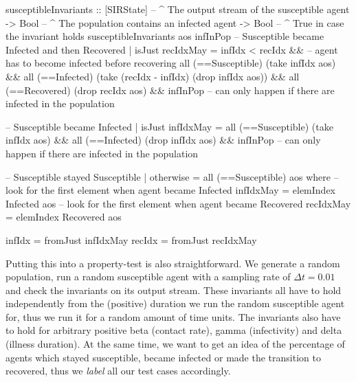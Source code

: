 \begin{HaskellCode}
susceptibleInvariants :: [SIRState] -- ^ The output stream of the susceptible agent 
                      -> Bool       -- ^ The population contains an infected agent
                      -> Bool       -- ^ True in case the invariant holds
susceptibleInvariants aos infInPop
    -- Susceptible became Infected and then Recovered
    | isJust recIdxMay 
      = infIdx < recIdx &&  -- agent has to become infected before recovering
        all (==Susceptible) (take infIdx aos) && 
        all (==Infected) (take (recIdx - infIdx) (drop infIdx aos)) && 
        all (==Recovered) (drop recIdx aos) &&
        infInPop  -- can only happen if there are infected in the population

    -- Susceptible became Infected
    | isJust infIdxMay 
      = all (==Susceptible) (take infIdx aos) &&
        all (==Infected) (drop infIdx aos) &&
        infInPop -- can only happen if there are infected in the population

    -- Susceptible stayed Susceptible
    | otherwise = all (==Susceptible) aos
  where
    -- look for the first element when agent became Infected
    infIdxMay = elemIndex Infected aos
    -- look for the first element when agent became Recovered
    recIdxMay = elemIndex Recovered aos

    infIdx = fromJust infIdxMay
    recIdx = fromJust recIdxMay
\end{HaskellCode}

Putting this into a property-test is also straightforward. We generate a random population, run a random susceptible agent with a sampling rate of $\Delta t = 0.01$ and check the invariants on its output stream. These invariants all have to hold independently from the (positive) duration we run the random susceptible agent for, thus we run it for a random amount of time units. The invariants also have to hold for arbitrary positive beta (contact rate), gamma (infectivity) and delta (illness duration). At the same time, we want to get an idea of the percentage of agents which stayed susceptible, became infected or made the transition to recovered, thus we \textit{label} all our test cases accordingly.

